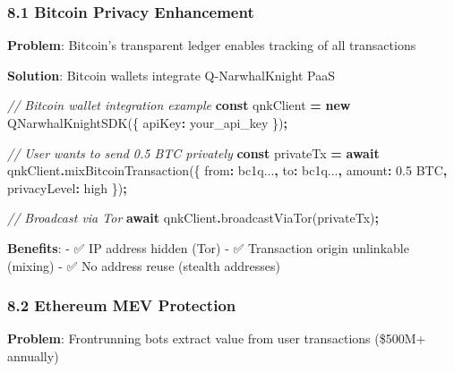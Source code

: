 \documentclass[
  11pt,
]{article}
\newenvironment{Shaded}{\begin{snugshade}}{\end{snugshade}}
\newcommand{\CommentTok}[1]{\textcolor[rgb]{0.56,0.35,0.01}{\textit{#1}}}
\newcommand{\ControlFlowTok}[1]{\textcolor[rgb]{0.13,0.29,0.53}{\textbf{#1}}}
\newcommand{\DataTypeTok}[1]{\textcolor[rgb]{0.13,0.29,0.53}{#1}}
\newcommand{\FunctionTok}[1]{\textcolor[rgb]{0.00,0.00,0.00}{#1}}
\newcommand{\KeywordTok}[1]{\textcolor[rgb]{0.13,0.29,0.53}{\textbf{#1}}}
\newcommand{\NormalTok}[1]{#1}
\newcommand{\OperatorTok}[1]{\textcolor[rgb]{0.81,0.36,0.00}{\textbf{#1}}}
\newcommand{\StringTok}[1]{\textcolor[rgb]{0.31,0.60,0.02}{#1}}
\begin{document}
\hypertarget{bitcoin-privacy-enhancement}{%
\subsubsection{8.1 Bitcoin Privacy
Enhancement}\label{bitcoin-privacy-enhancement}}

\textbf{Problem}: Bitcoin's transparent ledger enables tracking of all
transactions

\textbf{Solution}: Bitcoin wallets integrate Q-NarwhalKnight PaaS

\begin{Shaded}
\begin{Highlighting}[]
\CommentTok{// Bitcoin wallet integration example}
\KeywordTok{const}\NormalTok{ qnkClient }\OperatorTok{=} \KeywordTok{new} \FunctionTok{QNarwhalKnightSDK}\NormalTok{(\{ }\DataTypeTok{apiKey}\OperatorTok{:} \StringTok{\textquotesingle{}your\_api\_key\textquotesingle{}}\NormalTok{ \})}\OperatorTok{;}

\CommentTok{// User wants to send 0.5 BTC privately}
\KeywordTok{const}\NormalTok{ privateTx }\OperatorTok{=} \ControlFlowTok{await}\NormalTok{ qnkClient}\OperatorTok{.}\FunctionTok{mixBitcoinTransaction}\NormalTok{(\{}
  \DataTypeTok{from}\OperatorTok{:} \StringTok{\textquotesingle{}bc1q...\textquotesingle{}}\OperatorTok{,}
  \DataTypeTok{to}\OperatorTok{:} \StringTok{\textquotesingle{}bc1q...\textquotesingle{}}\OperatorTok{,}
  \DataTypeTok{amount}\OperatorTok{:} \StringTok{\textquotesingle{}0.5 BTC\textquotesingle{}}\OperatorTok{,}
  \DataTypeTok{privacyLevel}\OperatorTok{:} \StringTok{\textquotesingle{}high\textquotesingle{}}
\NormalTok{\})}\OperatorTok{;}

\CommentTok{// Broadcast via Tor}
\ControlFlowTok{await}\NormalTok{ qnkClient}\OperatorTok{.}\FunctionTok{broadcastViaTor}\NormalTok{(privateTx)}\OperatorTok{;}
\end{Highlighting}
\end{Shaded}

\textbf{Benefits}: - ✅ IP address hidden (Tor) - ✅ Transaction origin
unlinkable (mixing) - ✅ No address reuse (stealth addresses)

\hypertarget{ethereum-mev-protection}{%
\subsubsection{8.2 Ethereum MEV
Protection}\label{ethereum-mev-protection}}

\textbf{Problem}: Frontrunning bots extract value from user transactions
(\$500M+ annually)
\end{document}
